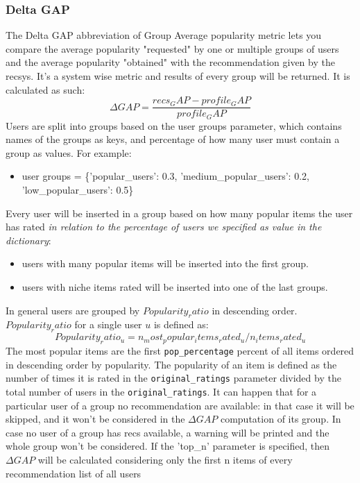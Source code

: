 \subsubsection{Delta GAP}\label{subsubsec:dg}
The Delta GAP abbreviation of Group Average popularity metric lets you compare the average popularity "requested" by
one or multiple groups of users and the average popularity "obtained" with the recommendation given by the recsys.
It's a system wise metric and results of every group will be returned.
It is calculated as such:
\hfill\break
\hfill\break
    \[
        \Delta GAP = \frac{recs_GAP - profile_GAP}{profile_GAP}
    \]
\hfill\break
\hfill\break
Users are split into groups based on the user groups parameter, which contains names of the groups as keys,
and percentage of how many user must contain a group as values.
For example:
\begin{itemize}
    \item user groups = \{'popular\_users': 0.3, 'medium\_popular\_users': 0.2, 'low\_popular\_users': 0.5\}
\end{itemize}
\hfill\break
\hfill\break
Every user will be inserted in a group based on how many popular items the user has rated
\textit{in relation to the percentage of users we specified as value in the dictionary}:
\begin{itemize}
    \item users with many popular items will be inserted into the first group.
    \item users with niche items rated will be inserted into one of the last groups.
\end{itemize}
\hfill\break
\hfill\break
In general users are grouped by $Popularity_ratio$ in descending order. $Popularity_ratio$ for a single user $u$
is defined as:
\hfill\break
\hfill\break
    \[
        Popularity_ratio_u = n_most_popular_items_rated_u / n_items_rated_u
    \]
\hfill\break
\hfill\break
The most popular items are the first \texttt{pop\_percentage} percent of all items ordered in descending order by
popularity.
The popularity of an item is defined as the number of times it is rated in the \texttt{original\_ratings} parameter
divided by the total number of users in the \texttt{original\_ratings}.
\hfill\break
\hfill\break
It can happen that for a particular user of a group no recommendation are available: in that case it will be skipped,
and it won't be considered in the $\Delta GAP$ computation of its group.
In case no user of a group has recs available, a warning will be printed and the whole group won't be considered.
If the 'top\_n' parameter is specified, then $\Delta GAP$ will be calculated considering only the first
n items of every recommendation list of all users
\hfill\break
\hfill\break

